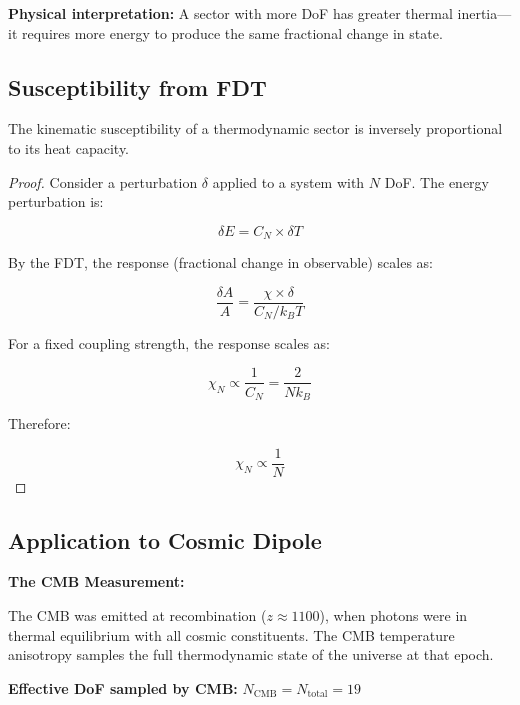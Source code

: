 \documentclass[12pt,a4paper]{article}
\begin{document}
\textbf{Physical interpretation:} A sector with more DoF has greater thermal inertia---it requires more energy to produce the same fractional change in state.

\subsection{Susceptibility from FDT}

\begin{theorem}
The kinematic susceptibility of a thermodynamic sector is inversely proportional to its heat capacity.
\end{theorem}

\begin{proof}
Consider a perturbation $\delta$ applied to a system with $N$ DoF. The energy perturbation is:

\begin{equation}
\delta E = C_N \times \delta T
\end{equation}

By the FDT, the response (fractional change in observable) scales as:

\begin{equation}
\frac{\delta A}{A} = \frac{\chi \times \delta}{C_N / k_B T}
\end{equation}

For a fixed coupling strength, the response scales as:

\begin{equation}
\chi_N \propto \frac{1}{C_N} = \frac{2}{N k_B}
\end{equation}

Therefore:

\begin{equation}
\boxed{\chi_N \propto \frac{1}{N}}
\end{equation}
\end{proof}

\subsection{Application to Cosmic Dipole}

\textbf{The CMB Measurement:}

The CMB was emitted at recombination ($z \approx 1100$), when photons were in thermal equilibrium with all cosmic constituents. The CMB temperature anisotropy samples the full thermodynamic state of the universe at that epoch.

\textbf{Effective DoF sampled by CMB:} $N_{\text{CMB}} = N_{\text{total}} = 19$
\end{document}
